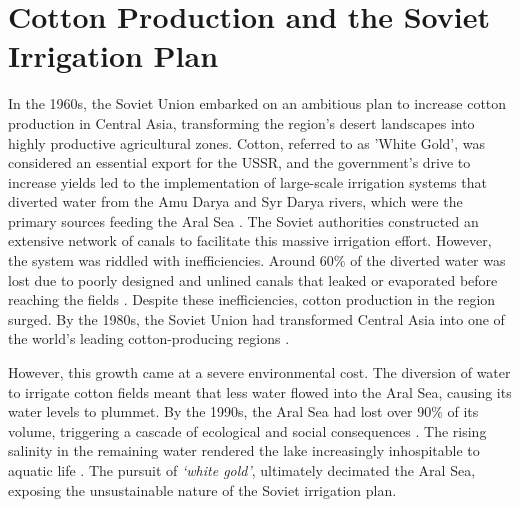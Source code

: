 \chapter[Cotton Production and the Soviet Irrigation Plan]{Cotton Production and the Soviet Irrigation Plan}
\label{cp:cotton-production}

In the 1960s, the Soviet Union embarked on an ambitious plan to increase cotton production in Central Asia, transforming the region’s desert landscapes into highly productive agricultural zones.\autocite{ebsco_aral} Cotton, referred to as 'White Gold', was considered an essential export for the USSR, and the government’s drive to increase yields led to the implementation of large-scale irrigation systems that diverted water from the Amu Darya and Syr Darya rivers, which were the primary sources feeding the Aral Sea \autocite{ejf_whitegold}.
The Soviet authorities constructed an extensive network of canals to facilitate this massive irrigation effort. However, the system was riddled with inefficiencies. Around 60\% of the diverted water was lost due to poorly designed and unlined canals that leaked or evaporated before reaching the fields \autocite{ejf_whitegold}\autocite{grabish_drytears}. Despite these inefficiencies, cotton production in the region surged. By the 1980s, the Soviet Union had transformed Central Asia into one of the world’s leading cotton-producing regions \autocite{conrad_irrigated}.

However, this growth came at a severe environmental cost. The diversion of water to irrigate cotton fields meant that less water flowed into the Aral Sea, causing its water levels to plummet. By the 1990s, the Aral Sea had lost over 90\% of its volume, triggering a cascade of ecological and social consequences \autocite{rasmussen_nasa}. The rising salinity in the remaining water rendered the lake increasingly inhospitable to aquatic life \autocite{plotnikov_fauna}. The pursuit of \textit{`white gold'}, ultimately decimated the Aral Sea, exposing the unsustainable nature of the Soviet irrigation plan.